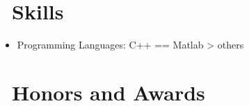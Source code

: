 \documentclass{resume}
\begin{document}

\section{\faCogs\ Skills}
\begin{itemize}[parsep=0.5ex]
  \item Programming Languages: C++ == Matlab > others
\end{itemize}
   
\section{\faHeartO\ Honors and Awards}

%
%
\end{document}

